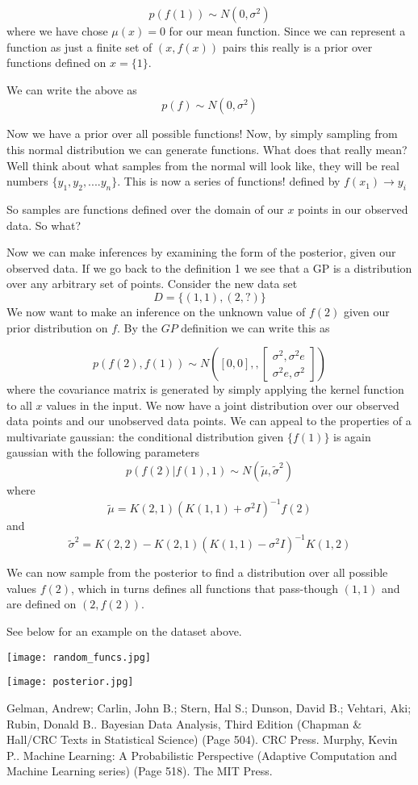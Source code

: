 \documentclass{article}
\begin{document}
$$p(f(1))\sim N(0,\sigma^2)$$
where we have chose $\mu(x)=0$ for our mean function. Since we can represent a function as just a finite set of $(x,f(x))$ pairs this really is a prior over functions defined on $x=\{1\}$.

We can write the above as 
$$p(f) \sim N(0,\sigma^2)$$

Now we have a prior over all possible functions! Now, by simply sampling from this normal distribution we can generate functions. 
What does that really mean? Well think about what samples from the normal will look like, they will be real numbers $\{y_1,y_2,....y_n\}$. This is now a series of functions! defined by $f(x_1)\rightarrow y_i$

So samples are functions defined over the domain of our $x$ points in our observed data. 
So what? 

Now we can make inferences by examining the form of the posterior, given our observed data. If we go back to the definition 1 we see that a GP is a distribution over any arbitrary set of points. Consider the new data set 
$$D=\{(1,1),(2,?)\}$$ 
We now want to make an inference on the unknown value of $f(2)$ given our prior distribution on $f$. By the $GP$ definition we can write this as 

$$p(f(2),f(1)) \sim N([0,0],,\begin{bmatrix}\sigma^2,\sigma^2e\\\sigma^2e,\sigma^2\end{bmatrix})$$
where the covariance matrix is generated by simply applying the kernel function to all $x$ values in the input. We now have a joint distribution over our observed data points and our unobserved data points. We can appeal to the properties of a multivariate gaussian: the conditional distribution given $\{f(1)\}$ is again gaussian with the following parameters
$$p(f(2)|f(1),1) \sim N(\tilde\mu,\tilde\sigma^2)$$
where $$\tilde\mu=K(2,1)(K(1,1)+\sigma^2I)^{-1}f(2)$$
and 
$$\tilde\sigma^2=K(2,2)-K(2,1)(K(1,1)-\sigma^2I)^{-1}K(1,2)$$

We can now sample from the posterior to find a distribution over all possible values $f(2)$, which in turns defines all functions that pass-though $(1,1)$ and are defined on $(2,f(2))$.

See below for an example on the dataset above.


\texttt{[image: random\_funcs.jpg]}

\texttt{[image: posterior.jpg]}



\begin{thebibliography}{99}

Gelman, Andrew; Carlin, John B.; Stern, Hal S.; Dunson, David B.; Vehtari, Aki; Rubin, Donald B.. Bayesian Data Analysis, Third Edition (Chapman & Hall/CRC Texts in Statistical Science) (Page 504). CRC Press. 
Murphy, Kevin P.. Machine Learning: A Probabilistic Perspective (Adaptive Computation and Machine Learning series) (Page 518). The MIT Press. 
\end{thebibliography}
\end{document}
